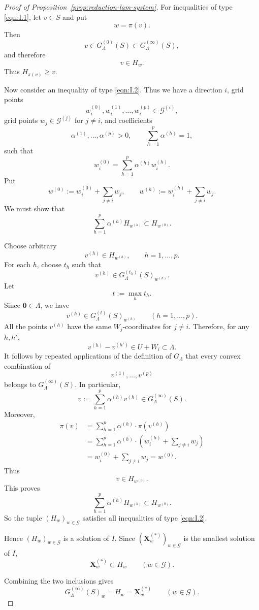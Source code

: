 \documentclass[10pt]{amsart}
\theoremstyle{plain}
\theoremstyle{definition}
\providecommand{\cG}[0]{\ensuremath{\mathcal G}\xspace}
\providecommand{\bX}[0]{\ensuremath{\mathbf X}\xspace}
\let\geq\geqslant
\begin{document}
\begin{proof}[Proof of Proposition~\ref{prop:reduction-lam-system}]
For inequalities of type \eqref{eqn:I.1}, let \(v\in S\) and put
\[
        w=\pi(v).
\]
Then
\[
        v\in G_\Lambda^{(0)}(S)\subset G_\Lambda^{(\infty)}(S),
\]
and therefore
\[
        v\in H_w.
\]
Thus \(H_{\pi(v)}\geq v\).

Now consider an inequality of type \eqref{eqn:I.2}.  Thus we have a direction
\(i\), grid points
\[
        w_i^{(0)},w_i^{(1)},\ldots,w_i^{(p)}\in \cG^{(i)},
\]
grid points \(w_j\in \cG^{(j)}\) for \(j\neq i\), and coefficients
\[
        \alpha^{(1)},\ldots,\alpha^{(p)}>0,\qquad
        \sum_{h=1}^p\alpha^{(h)}=1,
\]
such that
\[
        w_i^{(0)}
        =
        \sum_{h=1}^p\alpha^{(h)}w_i^{(h)}.
\]
Put
\[
        w^{(0)}:=w_i^{(0)}+\sum_{j\neq i}w_j,
        \qquad
        w^{(h)}:=w_i^{(h)}+\sum_{j\neq i}w_j.
\]
We must show that
\[
        \sum_{h=1}^p\alpha^{(h)}H_{w^{(h)}}
        \subset
        H_{w^{(0)}}.
\]

Choose arbitrary
\[
        v^{(h)}\in H_{w^{(h)}},
        \qquad h=1,\ldots,p.
\]
For each \(h\), choose \(t_h\) such that
\[
        v^{(h)}\in G_\Lambda^{(t_h)}(S)_{w^{(h)}}.
\]
Let
\[
        t:=\max_h t_h.
\]
Since \(\mathbf{0} \in\Lambda\), we have
\[
        v^{(h)}\in G_\Lambda^{(t)}(S)_{w^{(h)}}
        \qquad(h=1,\ldots,p).
\]
All the points \(v^{(h)}\) have the same \(W_j\)-coordinates for
\(j\neq i\).  Therefore, for any \(h,h'\),
\[
        v^{(h)}-v^{(h')}\in U+W_i\subset\Lambda.
\]
It follows by repeated applications of the definition of
\(G_\Lambda\) that every convex combination of
\[
        v^{(1)},\ldots,v^{(p)}
\]
belongs to \(G_\Lambda^{(\infty)}(S)\).  In particular,
\[
        v:=\sum_{h=1}^p\alpha^{(h)}v^{(h)}
        \in G_\Lambda^{(\infty)}(S).
\]
Moreover,
\[
\begin{aligned}
        \pi(v)
        &=
        \sum_{h=1}^p\alpha^{(h)} \cdot \pi(v^{(h)})        \\
        &=
        \sum_{h=1}^p\alpha^{(h)} \cdot 
        \left(
        w_i^{(h)}+\sum_{j\neq i}w_j
        \right)                                      \\
        &=
        w_i^{(0)}+\sum_{j\neq i}w_j
        =
        w^{(0)}.
\end{aligned}
\]
Thus
\[
        v\in H_{w^{(0)}}.
\]
This proves
\[
        \sum_{h=1}^p\alpha^{(h)}H_{w^{(h)}}
        \subset
        H_{w^{(0)}}.
\]
So the tuple \((H_w)_{w\in \cG}\) satisfies all inequalities of type
\eqref{eqn:I.2}.

Hence \((H_w)_{w\in \cG}\) is a solution of \(I\).  Since
\((\bX_w^{(*)})_{w\in \cG}\) is the smallest solution of \(I\),
\[
        \bX_w^{(*)}\subset H_w
        \qquad(w\in \cG).
\]

Combining the two inclusions gives
\[
        G_\Lambda^{(\infty)}(S)_w=H_w=\bX_w^{(*)}
        \qquad(w\in \cG).
\]
\end{proof}
\end{document}
